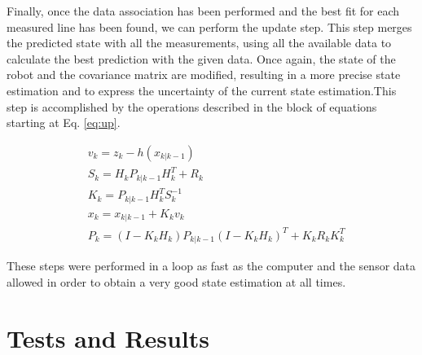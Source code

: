 \documentclass[journal]{IEEEtran}
\begin{document}
Finally, once the data association has been performed and the best fit for each measured line has been found, we can perform the update step. This step merges the predicted state with all the measurements, using all the available data to calculate the best prediction with the given data. Once again, the state of the robot and the covariance matrix are modified, resulting in a more precise state estimation and to express the uncertainty of the current state estimation.This step is accomplished by the operations described in the block of equations starting at Eq. \ref{eq:up}.

\begin{align}\label{eq:up}
& v_k = z_k - h(x_{k|k-1})\\
& S_k = H_k P_{k|k-1} H_k^T + R_k\\
& K_k = P_{k|k-1} H_k^T S_k^{-1}\\
& x_k = x_{k|k-1} + K_k v_k\\
& P_k = (I-K_k H_k)P_{k|k-1}(I-K_k H_k)^T+K_k R_k K_k^T
\end{align}


These steps were performed in a loop as fast as the computer and the sensor data allowed in order to obtain a very good state estimation at all times.




\section{Tests and Results}\label{results}
\end{document}
